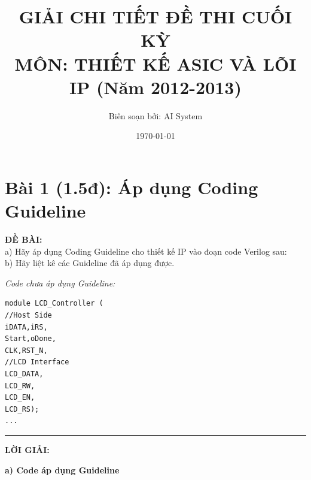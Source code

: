 \documentclass[12pt,a4paper]{article}
\title{\textbf{GIẢI CHI TIẾT ĐỀ THI CUỐI KỲ}\\MÔN: THIẾT KẾ ASIC VÀ LÕI IP (Năm 2012-2013)}
\author{Biên soạn bởi: AI System}
\date{\today}
\begin{document}
\maketitle
\tableofcontents
\newpage

\section{Bài 1 (1.5đ): Áp dụng Coding Guideline}
\textbf{ĐỀ BÀI:} \\
a) Hãy áp dụng Coding Guideline cho thiết kế IP vào đoạn code Verilog sau:\\
b) Hãy liệt kê các Guideline đã áp dụng được.

\textit{Code chưa áp dụng Guideline:}
\begin{lstlisting}[style=verilogstyle]
module LCD_Controller (  
//Host Side 
iDATA,iRS, 
Start,oDone, 
CLK,RST_N, 
//LCD Interface 
LCD_DATA, 
LCD_RW, 
LCD_EN, 
LCD_RS); 
...
\end{lstlisting}

\hrule\vspace{0.5cm}
\textbf{LỜI GIẢI:}

\textbf{a) Code áp dụng Guideline}
\end{document}
